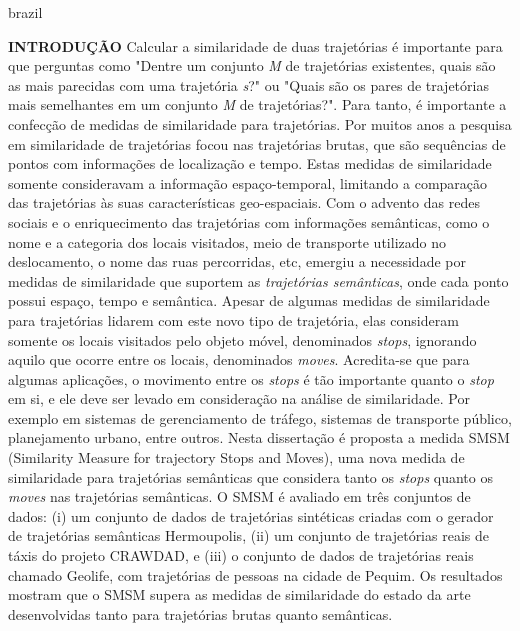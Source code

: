 {
    \begin{otherlanguage*}{brazil}
    \begin{resumo}
        \textbf{INTRODUÇÃO}
        \newline
        \newline
        {Calcular a similaridade de duas trajetórias é importante para que perguntas como "Dentre um conjunto \emph{M} de trajetórias existentes, quais são as mais parecidas com uma trajetória \emph{s}?" ou "Quais são os pares de trajetórias mais semelhantes em um conjunto \emph{M} de trajetórias?". Para tanto, é importante a confecção de medidas de similaridade para trajetórias.} Por muitos anos a pesquisa em similaridade de trajetórias focou nas trajetórias brutas, que são sequências de pontos com informações de localização e tempo. Estas medidas de similaridade somente consideravam a informação espaço-temporal, limitando a comparação das trajetórias às suas características geo-espaciais. Com o advento das redes sociais e o enriquecimento das trajetórias com informações semânticas, como o nome e a categoria dos locais visitados, meio de transporte utilizado no deslocamento, o nome das ruas percorridas, etc, emergiu a necessidade por medidas de similaridade que suportem as \emph{trajetórias semânticas}, onde cada ponto possui espaço, tempo e semântica. Apesar de algumas medidas de similaridade para trajetórias lidarem com este novo tipo de trajetória, elas consideram somente os locais visitados pelo objeto móvel, denominados \emph{stops}, ignorando aquilo que ocorre entre os locais, denominados \emph{moves}.
        Acredita-se que para algumas aplicações, o movimento entre os \emph{stops} é tão importante quanto o \emph{stop} em si, e ele deve ser levado em consideração na análise de similaridade. {Por exemplo em sistemas de gerenciamento de tráfego, sistemas de transporte público, planejamento urbano, entre outros.}
        Nesta dissertação é proposta a medida SMSM (Similarity Measure for trajectory Stops and Moves), uma nova medida de similaridade para trajetórias semânticas que considera tanto os \emph{stops} quanto os \emph{moves} nas trajetórias semânticas.
        O SMSM é avaliado em três conjuntos de dados: (i) um conjunto de dados de trajetórias sintéticas criadas com o gerador de trajetórias semânticas Hermoupolis, (ii) um conjunto de trajetórias reais {de táxis} do projeto CRAWDAD, e (iii) o conjunto de dados de trajetórias reais chamado Geolife, com trajetórias de pessoas na cidade de Pequim. Os resultados mostram que o SMSM supera as medidas de similaridade do estado da arte desenvolvidas tanto para trajetórias brutas quanto semânticas.
        

\end{resumo}
\end{otherlanguage*}}
